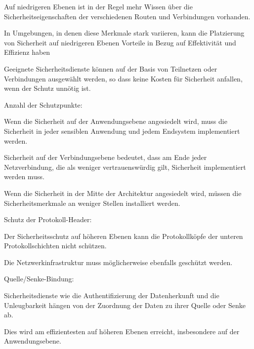\documentclass[a4paper]{article}
\begin{document}
\begin{multicols}{3}
\begin{itemize*}
            \begin{itemize*}
                  \item Auf niedrigeren Ebenen ist in der Regel mehr Wissen über die Sicherheitseigenschaften der verschiedenen Routen und Verbindungen vorhanden.
                  \item In Umgebungen, in denen diese Merkmale stark variieren, kann die Platzierung von Sicherheit auf niedrigeren Ebenen Vorteile in Bezug auf Effektivität und Effizienz haben
                  \item Geeignete Sicherheitsdienste können auf der Basis von Teilnetzen oder Verbindungen ausgewählt werden, so dass keine Kosten für Sicherheit anfallen, wenn der Schutz unnötig ist.
            \end{itemize*}
            \item
            Anzahl der Schutzpunkte:

            \begin{itemize*}
                  \item Wenn die Sicherheit auf der Anwendungsebene angesiedelt wird, muss die Sicherheit in jeder sensiblen Anwendung und jedem Endsystem implementiert werden.
                  \item Sicherheit auf der Verbindungsebene bedeutet, dass am Ende jeder Netzverbindung, die als weniger vertrauenswürdig gilt, Sicherheit implementiert werden muss.
                  \item Wenn die Sicherheit in der Mitte der Architektur angesiedelt wird, müssen die Sicherheitsmerkmale an weniger Stellen installiert werden.
            \end{itemize*}
            \item
            Schutz der Protokoll-Header:

            \begin{itemize*}
                  \item Der Sicherheitsschutz auf höheren Ebenen kann die Protokollköpfe der unteren Protokollschichten nicht schützen.
                  \item Die Netzwerkinfrastruktur muss möglicherweise ebenfalls geschützt werden.
            \end{itemize*}
            \item
            Quelle/Senke-Bindung:

            \begin{itemize*}
                  \item Sicherheitsdienste wie die Authentifizierung der Datenherkunft und die Unleugbarkeit hängen von der Zuordnung der Daten zu ihrer Quelle oder Senke ab.
                  \item Dies wird am effizientesten auf höheren Ebenen erreicht, insbesondere auf der Anwendungsebene.
            \end{itemize*}
      \end{itemize*}



\end{multicols}
\end{document}
